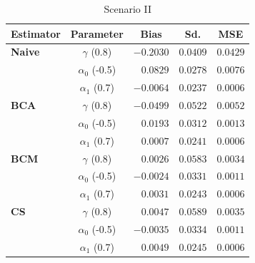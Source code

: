 \documentclass[11pt]{article}
\theoremstyle{definition}
\theoremstyle{remark}
\begin{document}
\begin{table}[ht]
\centering
\caption{Scenario II}
\begin{tabular}{l c r r r}
\hline
\hline
Estimator & Parameter & \multicolumn{1}{c}{Bias} & \multicolumn{1}{c}{Sd.} & \multicolumn{1}{c}{MSE} \\
\hline
\textbf{Naive} & $\gamma$ (0.8)   & $-0.2030$ & $0.0409$ & $0.0429$ \\
               & $\alpha_0$ (-0.5) & $0.0829$  & $0.0278$ & $0.0076$ \\
               & $\alpha_1$ (0.7)  & $-0.0064$ & $0.0237$ & $0.0006$ \\
\hline
\textbf{BCA}   & $\gamma$ (0.8)   & $-0.0499$ & $0.0522$ & $0.0052$ \\
               & $\alpha_0$ (-0.5) & $0.0193$  & $0.0312$ & $0.0013$ \\
               & $\alpha_1$ (0.7)  & $0.0007$  & $0.0241$ & $0.0006$ \\
\hline
\textbf{BCM}   & $\gamma$ (0.8)   & $0.0026$  & $0.0583$ & $0.0034$ \\
               & $\alpha_0$ (-0.5) & $-0.0024$ & $0.0331$ & $0.0011$ \\
               & $\alpha_1$ (0.7)  & $0.0031$  & $0.0243$ & $0.0006$ \\
\hline
\textbf{CS}    & $\gamma$ (0.8)   & $0.0047$  & $0.0589$ & $0.0035$ \\
               & $\alpha_0$ (-0.5) & $-0.0035$ & $0.0334$ & $0.0011$ \\
               & $\alpha_1$ (0.7)  & $0.0049$  & $0.0245$ & $0.0006$ \\
\hline
\hline
\end{tabular}
\end{table}
\end{document}

